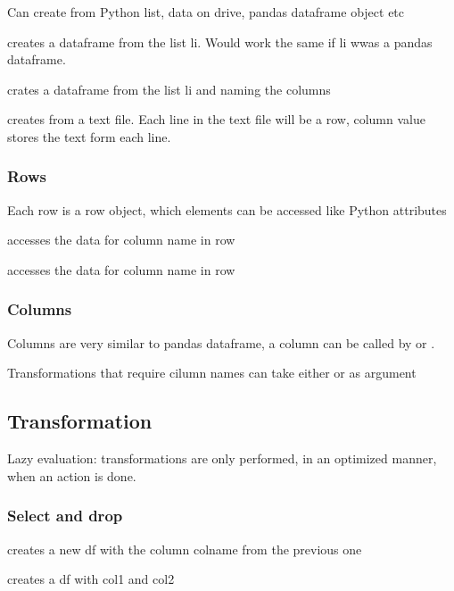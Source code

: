 			Can create from Python list, data on drive, pandas dataframe object etc

			 creates a dataframe from the list li. Would work the same if li wwas a pandas dataframe.

			 crates a dataframe from the list li and naming the columns

			 creates from a text file. Each line in the text file will be a row, column value stores the text form each line.


		\subsubsection{Rows}

			Each row is a row object, which elements can be accessed like Python attributes

			 accesses the data for column name in row

			 accesses the data for column name in row

		\subsubsection{Columns}

			Columns are very similar to pandas dataframe, a column can be called by  or .

			Transformations that require cilumn names can take either  or  as argument



	\subsection{Transformation}


		Lazy evaluation: transformations are only performed, in an optimized manner, when an action is done.

			\subsubsection{Select and drop}


				 creates a new df with the column colname from the previous one

				 creates a df with col1 and col2

